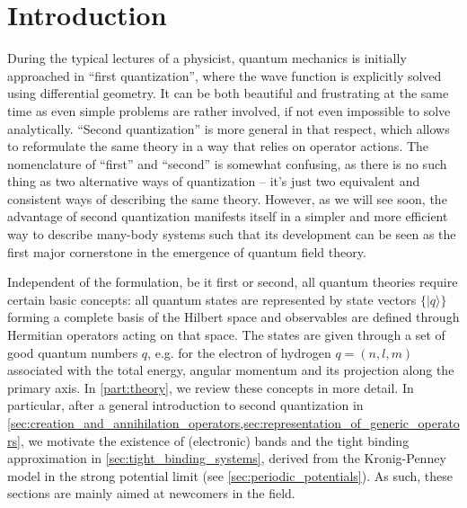 %
\chapter*{Introduction}
%
During the typical lectures of a physicist, quantum mechanics is initially approached in ``first quan\-ti\-zation'', where the wave function is explicitly solved using differential geometry.
It can be both beautiful and frustrating at the same time as even simple problems are rather involved, if not even impossible to solve analytically.
``Second quantization'' is more general in that respect, which allows to reformulate the same theory in a way that relies on operator actions.
The nomenclature of ``first'' and ``second'' is somewhat confusing, as there is no such thing as two alternative ways of quantization -- it's just two equivalent and consistent ways of describing the same theory.
However, as we will see soon, the advantage of second quantization manifests itself in a simpler and more efficient way to describe many-body systems such that its development can be seen as the first major cornerstone in the emergence of quantum field theory.

Independent of the formulation, be it first or second, all quantum theories require certain basic concepts:
all quantum states are represented by state vectors $\{|q\rangle\}$ forming a complete basis of the Hilbert space and observables are defined through Hermitian operators acting on that space.
The states are given through a set of good quantum numbers $q$, e.g. for the electron of hydrogen $q=(n,l,m)$ associated with the total energy, angular momentum and its projection along the primary axis.
In \cref{part:theory}, we review these concepts in more detail.
In particular, after a general introduction to second quantization in \cref{sec:creation_and_annihilation_operators,sec:representation_of_generic_operators}, we motivate the existence of (electronic) bands and the tight binding approximation in \cref{sec:tight_binding_systems}, derived from the Kronig-Penney model in the strong potential limit (see \cref{sec:periodic_potentials}).
As such, these sections are mainly aimed at newcomers in the field.

